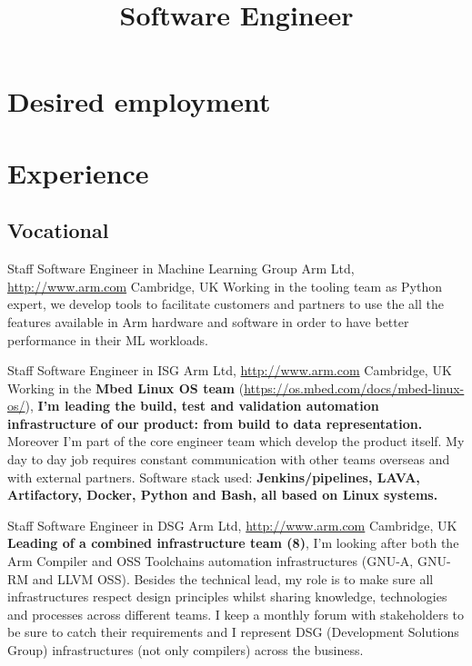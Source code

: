 \documentclass[10pt,a4paper,sans]{moderncv}
\title{Software Engineer}
\begin{document}
\makecvtitle\section{Desired employment}


\section{Experience}
\subsection{Vocational}
    {Staff Software Engineer in Machine Learning Group}
    {Arm Ltd, \url{http://www.arm.com}}
    {Cambridge, UK}{}
    {Working in the tooling team as Python expert, we develop tools to
    facilitate customers and partners to use the all the features available in
    Arm hardware and software in order to have better performance in their ML
    workloads.}

    {Staff Software Engineer in ISG}
    {Arm Ltd, \url{http://www.arm.com}}
    {Cambridge, UK}{}
    {Working in the \textbf{Mbed Linux OS team}
    (\url{https://os.mbed.com/docs/mbed-linux-os/}), \textbf{I'm leading the
    build, test and validation automation infrastructure of our product: from
    build to data representation.} Moreover I'm part of the core engineer team
    which develop the product itself. My day to day job requires constant
    communication with other teams overseas and with external partners.
    Software stack used: \textbf{Jenkins/pipelines, LAVA, Artifactory, Docker,
    Python and Bash, all based on Linux systems.}}

    {Staff Software Engineer in DSG}
    {Arm Ltd, \url{http://www.arm.com}}
    {Cambridge, UK}{}
    {\textbf{Leading of a combined infrastructure team (8)}, I'm looking after
    both the Arm Compiler and OSS Toolchains automation infrastructures (GNU-A,
    GNU-RM and LLVM OSS). Besides the technical lead, my role is to make sure
    all infrastructures respect design principles whilst sharing knowledge,
    technologies and processes across different teams. I keep a monthly forum
    with stakeholders to be sure to catch their requirements and I represent
    DSG (Development Solutions Group) infrastructures (not only compilers)
    across the business.}
\end{document}
